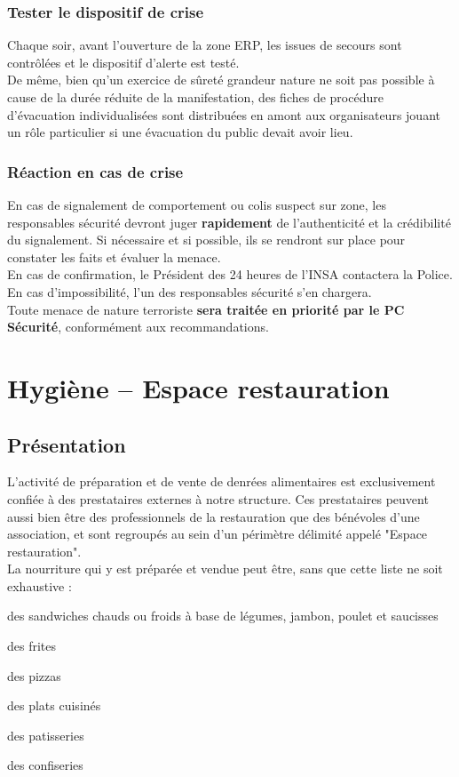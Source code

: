 \documentclass[hidelinks, paper=a4, fontsize=13pt]{report}
\begin{document}
\subsection{Tester le dispositif de crise}
Chaque soir, avant l'ouverture de la zone ERP, les issues de secours sont contrôlées et le dispositif d'alerte est testé.\\

De même, bien qu'un exercice de sûreté grandeur nature ne soit pas possible à cause de la durée réduite de la manifestation, des fiches de procédure d'évacuation individualisées sont distribuées en amont aux organisateurs jouant un rôle particulier si une évacuation du public devait avoir lieu.

\subsection{Réaction en cas de crise}
En cas de signalement de comportement ou colis suspect sur zone, les responsables sécurité devront juger \textbf{rapidement} de l’authenticité et la crédibilité du signalement. Si nécessaire et si possible, ils se rendront sur place pour constater les faits et évaluer la menace.\\
En cas de confirmation, le Président des 24 heures de l'INSA contactera la Police. En cas d’impossibilité, l'un des responsables sécurité s’en chargera.\\

Toute menace de nature terroriste \textbf{sera traitée en priorité par le PC Sécurité}, conformément aux recommandations.

\newpage
\chapter{Hygiène – Espace restauration}

\section{Présentation}

L'activité de préparation et de vente de denrées alimentaires est exclusivement confiée à des prestataires externes à notre structure. Ces prestataires peuvent aussi bien être des professionnels de la restauration que des bénévoles d'une association, et sont regroupés au sein d'un périmètre délimité appelé "Espace restauration". \\

La nourriture qui y est préparée et vendue peut être, sans que cette liste ne soit exhaustive :
\begin{list}{•}{}
	\item des sandwiches chauds ou froids à base de légumes, jambon, poulet et saucisses
	\item des frites
	\item des pizzas
	\item des plats cuisinés
	\item des patisseries
	\item des confiseries
\end{list}
\end{document}
